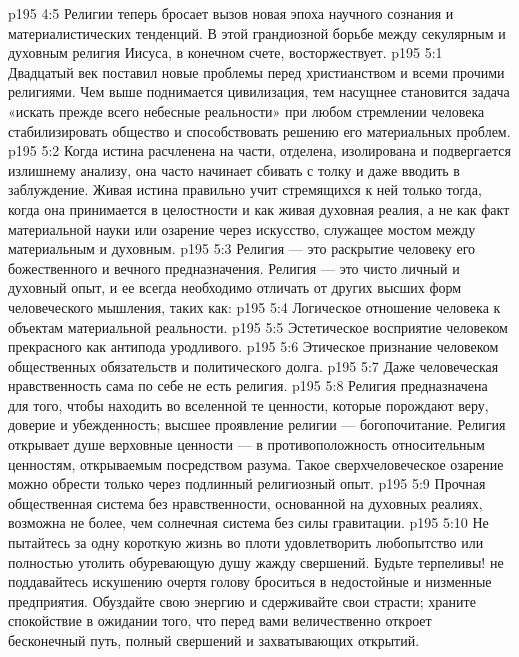 \vs p195 4:5 \pc Религии теперь бросает вызов новая эпоха научного сознания и материалистических тенденций. В этой грандиозной борьбе между секулярным и духовным религия Иисуса, в конечном счете, восторжествует.
\vs p195 5:1 Двадцатый век поставил новые проблемы перед христианством и всеми прочими религиями. Чем выше поднимается цивилизация, тем насущнее становится задача «искать прежде всего небесные реальности» при любом стремлении человека стабилизировать общество и способствовать решению его материальных проблем.
\vs p195 5:2 Когда истина расчленена на части, отделена, изолирована и подвергается излишнему анализу, она часто начинает сбивать с толку и даже вводить в заблуждение. Живая истина правильно учит стремящихся к ней только тогда, когда она принимается в целостности и как живая духовная реалия, а не как факт материальной науки или озарение через искусство, служащее мостом между материальным и духовным.
\vs p195 5:3 Религия --- это раскрытие человеку его божественного и вечного предназначения. Религия --- это чисто личный и духовный опыт, и ее всегда необходимо отличать от других высших форм человеческого мышления, таких как:
\vs p195 5:4 \bibnobreakspace Логическое отношение человека к объектам материальной реальности.
\vs p195 5:5 \bibnobreakspace Эстетическое восприятие человеком прекрасного как антипода уродливого.
\vs p195 5:6 \bibnobreakspace Этическое признание человеком общественных обязательств и политического долга.
\vs p195 5:7 \bibnobreakspace Даже человеческая нравственность сама по себе не есть религия.
\vs p195 5:8 \pc Религия предназначена для того, чтобы находить во вселенной те ценности, которые порождают веру, доверие и убежденность; высшее проявление религии --- богопочитание. Религия открывает душе верховные ценности --- в противоположность относительным ценностям, открываемым посредством разума. Такое сверхчеловеческое озарение можно обрести только через подлинный религиозный опыт.
\vs p195 5:9 Прочная общественная система без нравственности, основанной на духовных реалиях, возможна не более, чем солнечная система без силы гравитации.
\vs p195 5:10 Не пытайтесь за одну короткую жизнь во плоти удовлетворить любопытство или полностью утолить обуревающую душу жажду свершений. Будьте терпеливы! не поддавайтесь искушению очертя голову броситься в недостойные и низменные предприятия. Обуздайте свою энергию и сдерживайте свои страсти; храните спокойствие в ожидании того, что перед вами величественно откроет бесконечный путь, полный свершений и захватывающих открытий.
